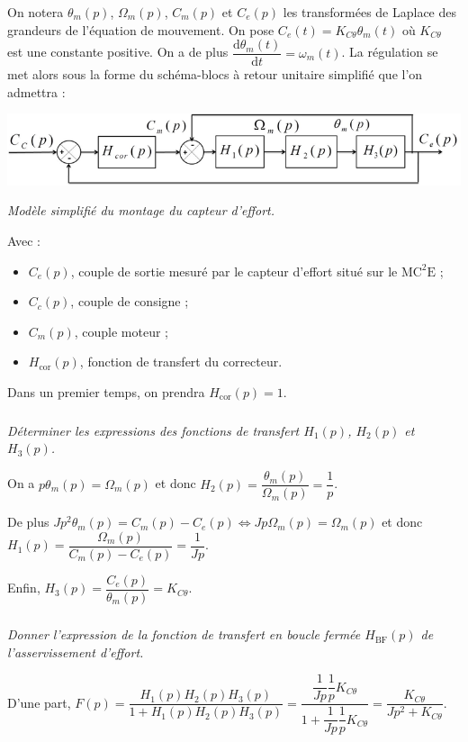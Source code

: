 \documentclass[10pt,fleqn]{article} %
\begin{document}
\begin{multicols}{2}
On notera $\theta_m(p)$, $\Omega_m(p)$, $C_m(p)$ et $C_e(p)$ les transformées de Laplace des grandeurs de l’équation de mouvement.
On pose $C_e(t)=K_{C\theta}\theta_m(t)$ où  $K_{C\theta}$ est une constante positive. On a de plus $\dfrac{\text{d}\theta_m(t)}{\text{d}t}=\omega_m(t)$. La régulation se met alors sous la forme du schéma-blocs à retour unitaire simplifié que l’on
admettra :

\begin{center}
\includegraphics[width=\linewidth]{images/Sujet/images/fig_06}

\textit{Modèle simplifié du montage du capteur d’effort.}
\end{center}

Avec :
\begin{itemize}
\item $C_e(p)$, couple de sortie mesuré par le capteur d’effort situé sur le $\text{MC}^2\text{E}$ ;
\item $C_c(p)$, couple de consigne ;
\item $C_m(p)$, couple moteur ;
\item $H_{\text{cor}}(p)$, fonction de transfert du correcteur.
\end{itemize}
Dans un premier temps, on prendra $H_{\text{cor}}(p)=1$.

\fi
\subparagraph{}
\textit{Déterminer les expressions des fonctions de transfert $H_1(p)$, $H_2(p)$ et $H_3(p)$.}
\ifprof
\begin{corrige}
On a $p\theta_m(p)=\Omega_m(p)$ et donc $H_2(p)=\dfrac{\theta_m(p)}{\Omega_m(p)}=\dfrac{1}{p}$.

De plus $Jp^2 \theta_m(p) = C_m(p)-C_e(p) \Leftrightarrow Jp\Omega_m(p) = \Omega_m(p)$ et donc $H_1(p)=\dfrac{\Omega_m(p)}{C_m(p)-C_e(p)}=\dfrac{1}{Jp}$.

Enfin, $H_3(p)=\dfrac{C_e(p)}{\theta_m(p)}=K_{C\theta}$.

\end{corrige}
\else
\fi

\subparagraph{}
\textit{Donner l’expression de la fonction de transfert en boucle fermée $H_{\text{BF}}(p)$ de l’asservissement d’effort.}

\ifprof
\begin{corrige}
D'une part, $F(p)=\dfrac{H_1(p)H_2(p)H_3(p)}{1+H_1(p)H_2(p)H_3(p)} =\dfrac{\dfrac{1}{Jp}\dfrac{1}{p}K_{C\theta}}{1+\dfrac{1}{Jp}\dfrac{1}{p}K_{C\theta}} =\dfrac{K_{C\theta}}{Jp^2+K_{C\theta}}$.


\end{corrige}
\end{multicols}
\end{document}
